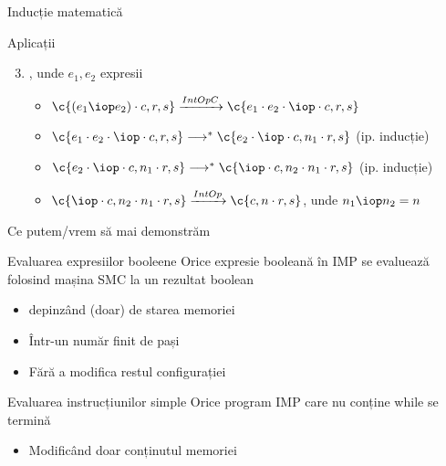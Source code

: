 \begin{section}{Inducție matematică}
\begin{subsection}{Aplicații}
\begin{frame}{}{}
\begin{block}{}
\begin{enumerate}
  \setcounter{enumi}{2}
  \item 
{}, unde $e_1, e_2$ expresii
\begin{itemize}
\item $\c{(e_1 \iop e_2) \cdot c, r, s}  \xrightarrow{IntOpC} \c{e_1 \cdot e_2 \cdot \iop \cdot c, r, s}$
\item $\c{e_1 \cdot e_2 \cdot \iop \cdot c, r, s} \longrightarrow^\ast \c{e_2 \cdot \iop \cdot c, n_1 \cdot r, s}$ \hfill (ip. inducție)
\item $\c{e_2 \cdot \iop \cdot c, n_1 \cdot r, s}  \longrightarrow^\ast \c{\iop \cdot c, n_2 \cdot n_1 \cdot r, s} $ \hfill (ip. inducție)
\item $\c{\iop \cdot c, n_2 \cdot n_1 \cdot r, s}\xrightarrow{IntOp} \c{c, n \cdot r, s}$, unde $n_1 \iop n_2 = n$
\end{itemize}
\end{enumerate}
\end{block}
\end{frame}

\begin{frame}{Ce putem/vrem să mai demonstrăm}
\begin{block}{Evaluarea expresiilor booleene}
Orice expresie booleană în IMP se evaluează folosind mașina SMC la un rezultat boolean
\begin{itemize}
\item depinzând (doar) de starea memoriei
\item Într-un număr finit de pași
\item Fără a modifica restul configurației
\end{itemize}
\end{block}
\begin{block}{Evaluarea instrucțiunilor simple}
Orice program IMP care nu conține while se termină
\begin{itemize}
\item Modificând doar conținutul memoriei
\end{itemize}
\end{block}

\end{frame}

\end{subsection}
\end{section}
